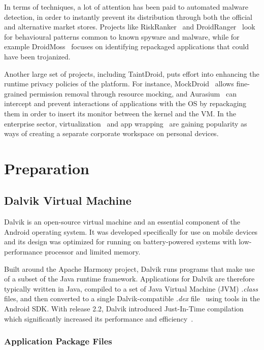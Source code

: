 \documentclass[12pt,twoside,notitlepage]{report}
\begin{document}
In terms of techniques, a lot of attention has been paid to automated malware detection, in order to instantly prevent its distribution through both the official and alternative market stores. Projects like RiskRanker~\cite{Grace:2012:RSA:2307636.2307663} and DroidRanger~\cite{Yajin:12NDSS} look for behavioural patterns common to known spyware and malware, while for example DroidMoss~\cite{Zhou:2012:DRS:2133601.2133640} focuses on identifying repackaged applications that could have been trojanized. 

Another large set of projects, including TaintDroid, puts effort into enhancing the runtime privacy policies of the platform. For instance, MockDroid~\cite{Beresford:2011:MTP:2184489.2184500} allows fine-grained permission removal through resource mocking, and Aurasium~\cite{Xu:2012:APP:2362793.2362820} can intercept and prevent interactions of applications with the OS by repackaging them in order to insert its monitor between the kernel and the VM. In the enterprise sector, virtualization~\cite{web:Virtualization} and app wrapping~\cite{web:AppWrapping} are gaining popularity as ways of creating a separate corporate workspace on personal devices.

\cleardoublepage
\chapter{Preparation}

\section{Dalvik Virtual Machine}

Dalvik is an open-source virtual machine and an essential component of the Android operating system. It was developed specifically for use on mobile devices and its design was optimized for running on battery-powered systems with low-performance processor and limited memory. 

Built around the Apache Harmony project, Dalvik runs programs that make use of a subset of the Java runtime framework. Applications for Dalvik are therefore typically written in Java, compiled to a set of Java Virtual Machine (JVM) \emph{.class} files, and then converted to a single Dalvik-compatible \emph{.dex} file~\cite{web:DalvikDex} using tools in the Android SDK. With release 2.2, Dalvik introduced Just-In-Time compilation which significantly increased its performance and efficiency~\cite{web:DalvikJit}.

\subsection{Application Package Files}
\end{document}
